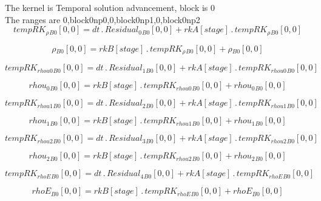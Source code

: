 \documentclass{article}
\begin{document}
\noindent The kernel is Temporal solution advancement, block is 0\\\noindent The ranges are 0,block0np0,0,block0np1,0,block0np2\\\begin{dmath}{tempRK_{\rho}{_{B0}}}[{0,0}] = dt \,.\, {Residual_{0}{_{B0}}}[{0,0}] + {rkA}[{stage}] \,.\, {tempRK_{\rho}{_{B0}}}[{0,0}]\end{dmath}

\begin{dmath}{\rho{_{B0}}}[{0,0}] = {rkB}[{stage}] \,.\, {tempRK_{\rho}{_{B0}}}[{0,0}] + {\rho{_{B0}}}[{0,0}]\end{dmath}

\begin{dmath}{tempRK_{rhou0}{_{B0}}}[{0,0}] = dt \,.\, {Residual_{1}{_{B0}}}[{0,0}] + {rkA}[{stage}] \,.\, {tempRK_{rhou0}{_{B0}}}[{0,0}]\end{dmath}

\begin{dmath}{rhou_{0}{_{B0}}}[{0,0}] = {rkB}[{stage}] \,.\, {tempRK_{rhou0}{_{B0}}}[{0,0}] + {rhou_{0}{_{B0}}}[{0,0}]\end{dmath}

\begin{dmath}{tempRK_{rhou1}{_{B0}}}[{0,0}] = dt \,.\, {Residual_{2}{_{B0}}}[{0,0}] + {rkA}[{stage}] \,.\, {tempRK_{rhou1}{_{B0}}}[{0,0}]\end{dmath}

\begin{dmath}{rhou_{1}{_{B0}}}[{0,0}] = {rkB}[{stage}] \,.\, {tempRK_{rhou1}{_{B0}}}[{0,0}] + {rhou_{1}{_{B0}}}[{0,0}]\end{dmath}

\begin{dmath}{tempRK_{rhou2}{_{B0}}}[{0,0}] = dt \,.\, {Residual_{3}{_{B0}}}[{0,0}] + {rkA}[{stage}] \,.\, {tempRK_{rhou2}{_{B0}}}[{0,0}]\end{dmath}

\begin{dmath}{rhou_{2}{_{B0}}}[{0,0}] = {rkB}[{stage}] \,.\, {tempRK_{rhou2}{_{B0}}}[{0,0}] + {rhou_{2}{_{B0}}}[{0,0}]\end{dmath}

\begin{dmath}{tempRK_{rhoE}{_{B0}}}[{0,0}] = dt \,.\, {Residual_{4}{_{B0}}}[{0,0}] + {rkA}[{stage}] \,.\, {tempRK_{rhoE}{_{B0}}}[{0,0}]\end{dmath}

\begin{dmath}{rhoE{_{B0}}}[{0,0}] = {rkB}[{stage}] \,.\, {tempRK_{rhoE}{_{B0}}}[{0,0}] + {rhoE{_{B0}}}[{0,0}]\end{dmath}
\end{document}
